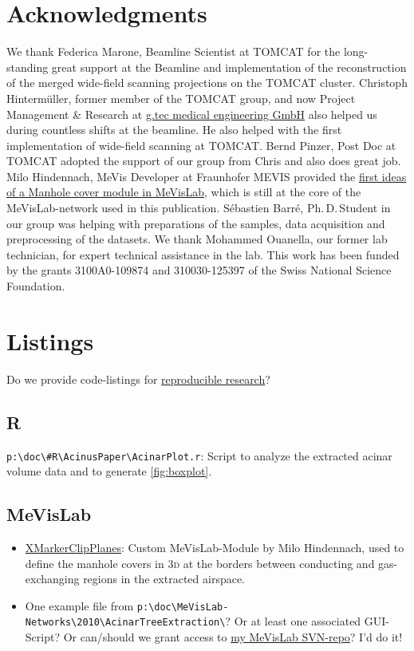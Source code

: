 \documentclass[%
	draft=false,
	paper=a4,%
	twoside=true,%
	draft=false,%
	abstract=false]{scrartcl}
\newcommand{\threed}{3\textsc{d}\xspace}
\begin{document}
\section{Acknowledgments}
We thank Federica Marone, Beamline Scientist at TOMCAT for the long-standing great support at the Beamline and implementation of the reconstruction of the merged wide-field scanning projections on the TOMCAT cluster. Christoph Hinterm\"{u}ller, former member of the TOMCAT group, and now Project Management \& Research at \href{http://gtec.at/}{g.tec medical engineering GmbH} also helped us during countless shifts at the beamline. He also helped with the first implementation of wide-field scanning at TOMCAT. Bernd Pinzer, Post Doc at TOMCAT adopted the support of our group from Chris and also does great job. Milo Hindennach, MeVis Developer at Fraunhofer MEVIS provided the \href{http://www.mevis-research.de/cgi-bin/discus/board-auth.cgi?lm=1282233250&file=/839/11760.html}{first ideas of a Manhole cover module in MeVisLab}, which is still at the core of the MeVisLab-network used in this publication. Sébastien Barré, Ph.\,D.\,Student in our group was helping with preparations of the samples, data acquisition and preprocessing of the datasets. We thank Mohammed Ouanella, our former lab technician, for expert technical assistance in the lab. This work has been funded by the grants 3100A0-109874 and 310030-125397  of the Swiss National Science Foundation.




\appendix
\section{Listings}
Do we provide code-listings for \href{http://reproducibleresearch.net}{reproducible research}?
\subsection{R}
\verb+p:\doc\#R\AcinusPaper\AcinarPlot.r+: Script to analyze the extracted acinar volume data and to generate \autoref{fig:boxplot}.

\subsection{MeVisLab}
\begin{itemize}
	\item \href{http://www.mevis-research.de/cgi-bin/discus/board-auth.cgi?lm=1282233250&file=/839/11760.html}{XMarkerClipPlanes}: Custom MeVisLab-Module by Milo Hindennach, used to define the manhole covers in \threed at the borders between conducting and gas-exchanging regions in the extracted airspace.
	\item One example file from \verb+p:\doc\MeVisLab-Networks\2010\AcinarTreeExtraction\+? Or at least one associated GUI-Script? Or can/should we grant access to \href{http://is.gd/n24V7g}{my MeVisLab SVN-repo}? I’d do it!
\end{itemize}
 
\end{document}
